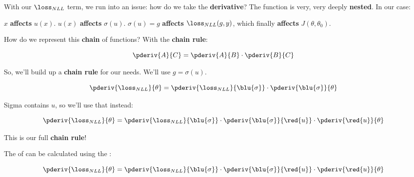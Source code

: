         With our $\loss_{NLL}$ term, we run into an issue: how do we take the \textbf{derivative}? The function is very, very deeply \textbf{nested}. In our case: 
        
        $x$ \textbf{affects} $u(x)$. $u(x)$ \textbf{affects} $\sigma(u)$. $\sigma(u)=g$ \textbf{affects} $\loss_{NLL}(g,y)$, which finally \textbf{affects} $J(\theta,\theta_0)$. 
        
        How do we represent this \textbf{chain} of functions? With the \textbf{chain rule}:
        
        \begin{equation}
            \pderiv{A}{C} = \pderiv{A}{B} \cdot \pderiv{B}{C}
        \end{equation}
        
        So, we'll build up a \textbf{chain rule} for our needs. We'll use $g=\sigma(u)$.
        
        \begin{equation}
            \pderiv{ \loss_{NLL} }{ \theta } 
            = 
            \pderiv{ \loss_{NLL} }{\blu{\sigma}} 
            \cdot 
            \pderiv{\blu{\sigma}}{\theta}
        \end{equation}
        
        Sigma contains $u$, so we'll use that instead:

        \begin{equation}
            \pderiv{ \loss_{NLL} }{ \theta } 
            = 
            \pderiv{ \loss_{NLL} }{ \blu{\sigma} } 
            \cdot 
            \pderiv{ \blu{\sigma} }{\red{u}} 
            \cdot 
            \pderiv{\red{u}}{\theta}
        \end{equation}
        
        This is our full \textbf{chain rule}!\\
        
        \begin{kequation}
            The  of  can be calculated using the :
            
            \begin{equation}
                \pderiv{ \loss_{NLL} }{ \theta } 
                = 
                \pderiv{ \loss_{NLL} }{\blu{\sigma}} 
                \cdot 
                \pderiv{ \blu{\sigma} }{\red{u}} 
                \cdot 
                \pderiv{\red{u}}{\theta}
            \end{equation}
        \end{kequation}
        
